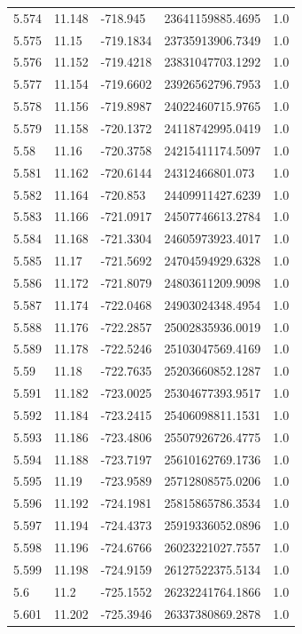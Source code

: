 \begin{tabular}{lllll}
5.574 & 11.148 & -718.945 & 23641159885.4695 & 1.0 \\
5.575 & 11.15 & -719.1834 & 23735913906.7349 & 1.0 \\
5.576 & 11.152 & -719.4218 & 23831047703.1292 & 1.0 \\
5.577 & 11.154 & -719.6602 & 23926562796.7953 & 1.0 \\
5.578 & 11.156 & -719.8987 & 24022460715.9765 & 1.0 \\
5.579 & 11.158 & -720.1372 & 24118742995.0419 & 1.0 \\
5.58 & 11.16 & -720.3758 & 24215411174.5097 & 1.0 \\
5.581 & 11.162 & -720.6144 & 24312466801.073 & 1.0 \\
5.582 & 11.164 & -720.853 & 24409911427.6239 & 1.0 \\
5.583 & 11.166 & -721.0917 & 24507746613.2784 & 1.0 \\
5.584 & 11.168 & -721.3304 & 24605973923.4017 & 1.0 \\
5.585 & 11.17 & -721.5692 & 24704594929.6328 & 1.0 \\
5.586 & 11.172 & -721.8079 & 24803611209.9098 & 1.0 \\
5.587 & 11.174 & -722.0468 & 24903024348.4954 & 1.0 \\
5.588 & 11.176 & -722.2857 & 25002835936.0019 & 1.0 \\
5.589 & 11.178 & -722.5246 & 25103047569.4169 & 1.0 \\
5.59 & 11.18 & -722.7635 & 25203660852.1287 & 1.0 \\
5.591 & 11.182 & -723.0025 & 25304677393.9517 & 1.0 \\
5.592 & 11.184 & -723.2415 & 25406098811.1531 & 1.0 \\
5.593 & 11.186 & -723.4806 & 25507926726.4775 & 1.0 \\
5.594 & 11.188 & -723.7197 & 25610162769.1736 & 1.0 \\
5.595 & 11.19 & -723.9589 & 25712808575.0206 & 1.0 \\
5.596 & 11.192 & -724.1981 & 25815865786.3534 & 1.0 \\
5.597 & 11.194 & -724.4373 & 25919336052.0896 & 1.0 \\
5.598 & 11.196 & -724.6766 & 26023221027.7557 & 1.0 \\
5.599 & 11.198 & -724.9159 & 26127522375.5134 & 1.0 \\
5.6 & 11.2 & -725.1552 & 26232241764.1866 & 1.0 \\
5.601 & 11.202 & -725.3946 & 26337380869.2878 & 1.0 \\

\end{tabular}
